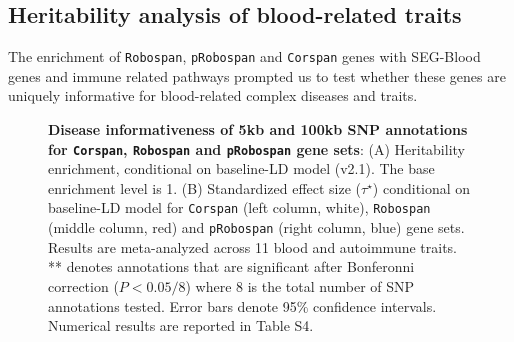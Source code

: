 \documentclass{bioinfo}
\def\Robocov{\texttt{Robocov}}
\def\Robospan{\texttt{Robospan}}
\def\pRobospan{\texttt{pRobospan}}
\def\Corspan{\texttt{Corspan}}
\begin{document}
\subsection*{Heritability analysis of blood-related traits}

The enrichment of \Robospan{}, \pRobospan{} and \Corspan{} genes with SEG-Blood genes and immune related pathways prompted us to test whether these genes are uniquely informative for blood-related complex diseases and traits.

\begin{figure}[!tpb]
\centering
{}
\caption{\small {\textbf{Disease informativeness of 5kb and 100kb SNP annotations for \Corspan{}, \Robospan{} and \pRobospan{} gene sets}: (A) Heritability enrichment, conditional on baseline-LD model (v2.1). The base enrichment level is 1. (B) Standardized effect size ($\tau^{\star}$) conditional on baseline-LD model for \Corspan{} (left column, white), \Robospan{} (middle column, red) and \pRobospan{} (right column, blue) gene sets. Results are meta-analyzed across 11 blood and autoimmune traits. ** denotes annotations that are significant after Bonferonni correction ($P < 0.05/8$) where $8$ is the total number of SNP annotations tested. Error bars denote 95$\%$ confidence intervals. Numerical results are reported in Table S4.}}
\label{fig:Robocov_marginal}
\end{figure}
\end{document}
